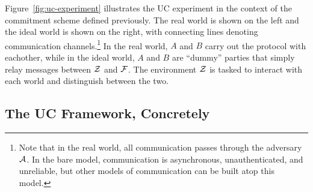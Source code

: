  Figure~\ref{fig:uc-experiment}
illustrates the UC experiment in the context of the commitment scheme defined
previously. The real world is shown on the left and the ideal world is shown on
the right, with connecting lines denoting communication channels.\footnote{Note
  that in the real world, all communication passes through the adversary
  $\mathcal{{A}}$. In the bare model, communication is asynchronous, unauthenticated,
  and unreliable, but other models of communication can be built atop this
  model.} In the real world, $A$ and $B$ carry out the protocol with eachother,
while in the ideal world, $A$ and $B$ are ``dummy'' parties that simply relay
messages between $\mathcal{{Z}}$ and $\mathcal{{F}}$. The environment $\mathcal{{Z}}$ is tasked to
interact with each world and distinguish between the two.

\subsection{The UC Framework, Concretely}
\label{subsec:sauce-flavored}


